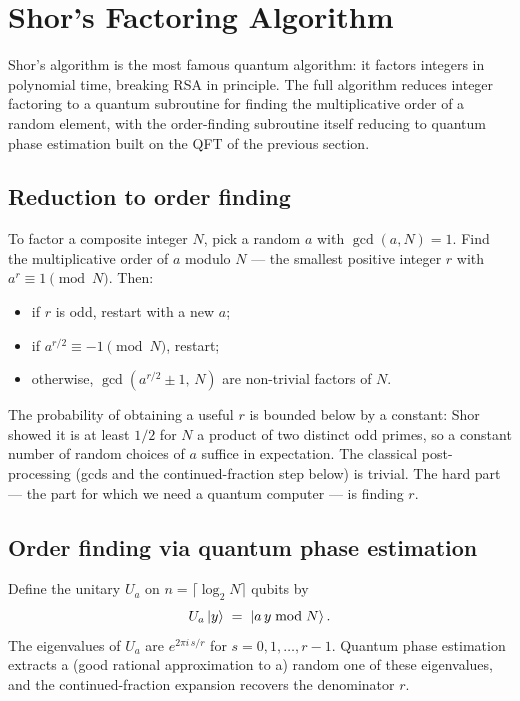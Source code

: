 \setcounter{equation}{0}
\section{Shor's Factoring Algorithm}
\label{sec:shor}

Shor's algorithm \cite{ptafpf94} is the most famous quantum algorithm: it factors integers in polynomial time, breaking RSA in principle. The full algorithm reduces integer factoring to a quantum subroutine for finding the multiplicative order of a random element, with the order-finding subroutine itself reducing to quantum phase estimation built on the QFT of the previous section.

\subsection{Reduction to order finding}

To factor a composite integer $N$, pick a random $a$ with $\gcd(a,N)=1$. Find the multiplicative order of $a$ modulo $N$ --- the smallest positive integer $r$ with $a^r \equiv 1 \pmod{N}$. Then:
\begin{itemize}
\item if $r$ is odd, restart with a new $a$;
\item if $a^{r/2} \equiv -1 \pmod{N}$, restart;
\item otherwise, $\gcd(a^{r/2} \pm 1,\, N)$ are non-trivial factors of $N$.
\end{itemize}
The probability of obtaining a useful $r$ is bounded below by a constant: Shor showed it is at least $1/2$ for $N$ a product of two distinct odd primes, so a constant number of random choices of $a$ suffice in expectation. The classical post-processing (gcds and the continued-fraction step below) is trivial. The hard part --- the part for which we need a quantum computer --- is finding $r$.

\subsection{Order finding via quantum phase estimation}

Define the unitary $U_a$ on $n = \lceil \log_2 N \rceil$ qubits by
\begin{equation}
U_a \mathinner{|{y}\rangle} \;=\; \mathinner{|{a\,y \bmod N}\rangle}.
\end{equation}
The eigenvalues of $U_a$ are $e^{2\pi i\, s / r}$ for $s = 0,1,\ldots,r-1$. Quantum phase estimation extracts a (good rational approximation to a) random one of these eigenvalues, and the continued-fraction expansion recovers the denominator $r$.

